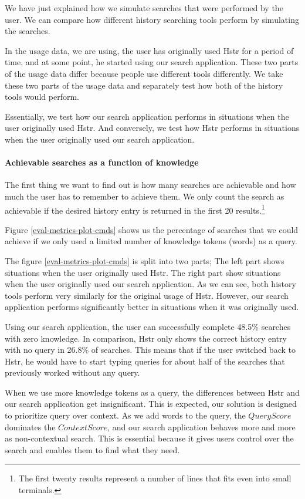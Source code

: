 We have just explained how we simulate searches that were performed by the user. We can compare how different history searching tools perform by simulating the searches. 

In the usage data, we are using, the user has originally used Hstr for a period of time, and at some point, he started using our search application. These two parts of the usage data differ because people use different tools differently. We take these two parts of the usage data and separately test how both of the history tools would perform. 

Essentially, we test how our search application performs in situations when the user originally used Hstr. And conversely, we test how Hstr performs in situations when the user originally used our search application.

\paragraph{Achievable searches as a function of knowledge}

The first thing we want to find out is how many searches are achievable and how much the user has to remember to achieve them. We only count the search as achievable if the desired history entry is returned in the first 20 results.\footnote{The first twenty results represent a number of lines that fits even into small terminals.} 

Figure \ref{eval-metrics-plot-cmds} shows us the percentage of searches that we could achieve if we only used a limited number of knowledge tokens (words) as a query. 

The figure \ref{eval-metrics-plot-cmds} is split into two parts; The left part shows situations when the user originally used Hstr. The right part show situations when the user originally used our search application. As we can see, both history tools perform very similarly for the original usage of Hstr. However, our search application performs significantly better in situations when it was originally used. 

Using our search application, the user can successfully complete 48.5\% searches with zero knowledge. In comparison, Hstr only shows the correct history entry with no query in 26.8\% of searches. 
This means that if the user switched back to Hstr, he would have to start typing queries for about half of the searches that previously worked without any query.


When we use more knowledge tokens as a query, the differences between Hstr and our search application get insignificant. This is expected, our solution is designed to prioritize query over context. As we add words to the query, the \(QueryScore\) dominates the \(ContextScore\), and our search application behaves more and more as non-contextual search. This is essential because it gives users control over the search and enables them to find what they need.

